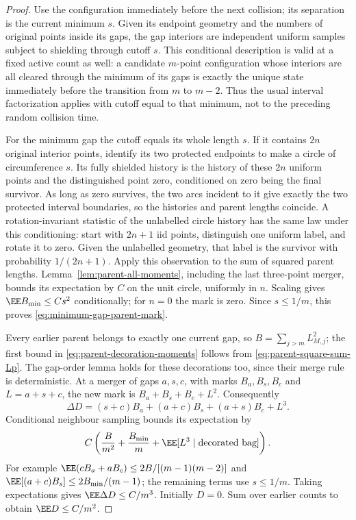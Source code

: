 \documentclass[11pt,letterpaper]{article}
\begin{document}
\begin{proof}
Use the configuration immediately before the next collision;
its separation is the current minimum $s$. Given its endpoint
geometry and the numbers of original points inside its gaps,
the gap interiors are independent uniform samples subject to
shielding through cutoff $s$. This conditional description is
valid at a fixed active count as well: a candidate $m$-point
configuration whose interiors are all cleared through the
minimum of its gaps is exactly the unique state immediately
before the transition from $m$ to $m-2$. Thus the usual interval
factorization applies with cutoff equal to that minimum, not
to the preceding random collision time.

For the minimum gap the cutoff equals its whole length $s$.
If it contains $2n$ original interior points, identify its two
protected endpoints to make a circle of circumference $s$.
Its fully shielded history is the history of these $2n$ uniform
points and the distinguished point zero, conditioned on zero
being the final survivor. As long as zero survives, the two
arcs incident to it give exactly the two protected interval
boundaries, so the histories and parent lengths coincide.
A rotation-invariant statistic of the unlabelled circle history
has the same law under this conditioning: start with $2n+1$
iid points, distinguish one uniform label, and rotate it to
zero. Given the unlabelled geometry, that label is the survivor
with probability $1/(2n+1)$. Apply this observation to the sum
of squared parent lengths. Lemma~\ref{lem:parent-all-moments},
including the last three-point merger, bounds its expectation
by $C$ on the unit circle, uniformly in $n$.
Scaling gives $\EE B_{\min}\le Cs^2$ conditionally; for $n=0$
the mark is zero. Since $s\le1/m$, this proves
\eqref{eq:minimum-gap-parent-mark}.

Every earlier parent belongs to exactly one current gap, so
$B=\sum_{j>m}L_{M,j}^2$; the first bound in
\eqref{eq:parent-decoration-moments} follows from
\eqref{eq:parent-square-sum-Lp}. The gap-order lemma holds for
these decorations too, since their merge rule is deterministic.
At a merger of gaps $a,s,c$, with marks $B_a,B_s,B_c$ and
$L=a+s+c$, the new mark is $B_a+B_s+B_c+L^2$.
Consequently
\[
 \Delta D=(s+c)B_a+(a+c)B_s+(a+s)B_c+L^3.
\]
Conditional neighbour sampling bounds its expectation by
\[
 C\left(\frac{B}{m^2}+\frac{B_{\min}}m
                                  +\EE[L^3\mid\text{decorated bag}]\right).
\]
For example
$\EE(cB_a+aB_c)\le2B/[(m-1)(m-2)]$ and
$\EE[(a+c)B_s]\le2B_{\min}/(m-1)$; the remaining terms use
$s\le1/m$. Taking expectations gives $\EE\Delta D\le C/m^3$.
Initially $D=0$. Sum over earlier counts to obtain
$\EE D\le C/m^2$.
\end{proof}
\end{document}
